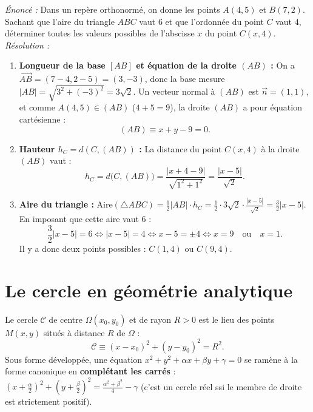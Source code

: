 \begin{exemple}
\emph{Énoncé :} Dans un repère orthonormé, on donne les points $A(4, 5)$ et $B(7, 2)$. Sachant que l'aire du triangle $ABC$ vaut $6$ et que l'ordonnée du point $C$ vaut $4$, déterminer toutes les valeurs possibles de l'abscisse $x$ du point $C(x, 4)$.\\
\emph{Résolution :}
\begin{enumerate}
    \item \textbf{Longueur de la base $[AB]$ et équation de la droite $(AB)$ :} On a $\overrightarrow{AB} = (7-4, 2-5) = (3, -3)$, donc la base mesure $|AB| = \sqrt{3^2 + (-3)^2} = 3\sqrt{2}$. Un vecteur normal à $(AB)$ est $\vec{n} = (1, 1)$, et comme $A(4,5) \in (AB)$ ($4+5=9$), la droite $(AB)$ a pour équation cartésienne :
    \[
        (AB) \equiv x + y - 9 = 0.
    \]
    \item \textbf{Hauteur $h_C = d(C, (AB))$ :} La distance du point $C(x, 4)$ à la droite $(AB)$ vaut :
    \[
        h_C = d\bigl(C, (AB)\bigr) = \frac{|x + 4 - 9|}{\sqrt{1^2 + 1^2}} = \frac{|x - 5|}{\sqrt{2}}.
    \]
    \item \textbf{Aire du triangle :} $\text{Aire}(\triangle ABC) = \frac{1}{2}|AB|\cdot h_C = \frac{1}{2}\cdot 3\sqrt{2} \cdot \frac{|x-5|}{\sqrt{2}} = \frac{3}{2}|x-5|$. En imposant que cette aire vaut $6$ :
    \[
        \frac{3}{2}|x - 5| = 6 \iff |x - 5| = 4 \iff x - 5 = \pm 4 \iff x = 9 \quad\text{ou}\quad x = 1.
    \]
    Il y a donc deux points possibles : $\boxed{C(1, 4) \text{ ou } C(9, 4)}$.
\end{enumerate}
\end{exemple}

\section{Le cercle en géométrie analytique}

\begin{theoreme}
Le cercle $\mathcal{C}$ de centre $\Omega(x_0, y_0)$ et de rayon $R > 0$ est le lieu des points $M(x,y)$ situés à distance $R$ de $\Omega$ :
\[
    \boxed{\mathcal{C} \equiv (x - x_0)^2 + (y - y_0)^2 = R^2}.
\]
Sous forme développée, une équation $x^2 + y^2 + \alpha x + \beta y + \gamma = 0$ se ramène à la forme canonique en \textbf{complétant les carrés} : $\left(x + \frac{\alpha}{2}\right)^2 + \left(y + \frac{\beta}{2}\right)^2 = \frac{\alpha^2+\beta^2}{4} - \gamma$ (c'est un cercle réel ssi le membre de droite est strictement positif).
\end{theoreme}


